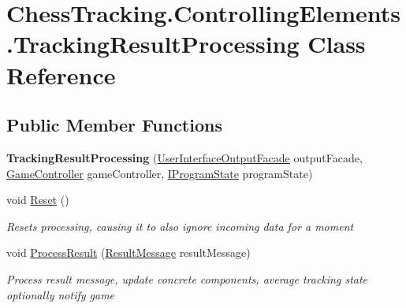 \hypertarget{class_chess_tracking_1_1_controlling_elements_1_1_tracking_result_processing}{}\section{Chess\+Tracking.\+Controlling\+Elements.\+Tracking\+Result\+Processing Class Reference}
\label{class_chess_tracking_1_1_controlling_elements_1_1_tracking_result_processing}
\subsection*{Public Member Functions}
\begin{DoxyCompactItemize}
\item 
\mbox{\label{class_chess_tracking_1_1_controlling_elements_1_1_tracking_result_processing_af0758e3150489772fb60b6fb6c2293a0}} 
{\bfseries Tracking\+Result\+Processing} (\mbox{\hyperlink{class_chess_tracking_1_1_user_interface_1_1_user_interface_output_facade}{User\+Interface\+Output\+Facade}} output\+Facade, \mbox{\hyperlink{class_chess_tracking_1_1_game_1_1_game_controller}{Game\+Controller}} game\+Controller, \mbox{\hyperlink{interface_chess_tracking_1_1_controlling_elements_1_1_program_state_1_1_i_program_state}{I\+Program\+State}} program\+State)
\item 
void \mbox{\hyperlink{class_chess_tracking_1_1_controlling_elements_1_1_tracking_result_processing_a0c956c9f6a02827b81ef1faa8c3a8be0}{Reset}} ()
\begin{DoxyCompactList}\small\item\em Resets processing, causing it to also ignore incoming data for a moment \end{DoxyCompactList}\item 
void \mbox{\hyperlink{class_chess_tracking_1_1_controlling_elements_1_1_tracking_result_processing_afe3faad7ae84ed1dd020f0e8a7a57d7e}{Process\+Result}} (\mbox{\hyperlink{class_chess_tracking_1_1_multithreading_messages_1_1_result_message}{Result\+Message}} result\+Message)
\begin{DoxyCompactList}\small\item\em Process result message, update concrete components, average tracking state optionally notify game \end{DoxyCompactList}\end{DoxyCompactItemize}
